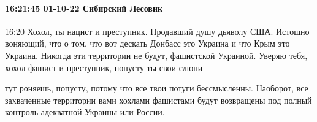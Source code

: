  
 
 
 
 

\paragraph{16:21:45 01-10-22 Сибирский Лесовик}
16:20
Хохол, ты нацист и преступник. Продавший душу дьяволу США. Истошно воняющий, что о том, что вот дескать Донбасс это Украина и что Крым это Украина. Никогда эти территории не будут, фашистской Украиной. Уверяю тебя, хохол фашист и преступник, попусту ты свои слюни

тут роняешь, попусту, потому что все твои потуги бессмысленны. Наоборот, все захваченные территории вами хохлами фашистами будут возвращены под полный контроль адекватной Украины или России.
